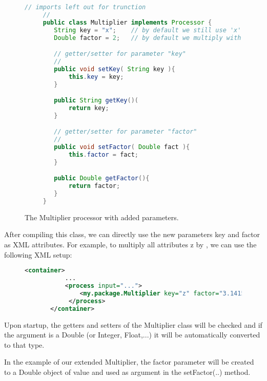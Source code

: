 \begin{figure}[h!]
  \centering \footnotesize{
  \begin{lstlisting}[language=Java]
     // imports left out for trunction
     //
     public class Multiplier implements Processor {
        String key = "x";    // by default we still use 'x'
        Double factor = 2;   // by default we multiply with 2

        // getter/setter for parameter "key"
        //
        public void setKey( String key ){
            this.key = key;
        }

        public String getKey()(
            return key;
        }

        // getter/setter for parameter "factor"
        // 
        public void setFactor( Double fact ){
            this.factor = fact;
        }

        public Double getFactor(){
            return factor;
        }
     }
  \end{lstlisting}}
  \caption{\label{fig:multiplyParameters}The {\ttfamily Multiplier} processor with added parameters.}
\end{figure}
        
After compiling this class, we can directly use the new parameters
{\ttfamily key} and {\ttfamily factor} as XML attributes. For example,
to multiply all attributes {\ttfamily z} by {}, we can
use the following XML setup:

\begin{figure}[h!]
  \centering
  \begin{lstlisting}[language=XML]
       <container>
           ...
           <process input="...">
               <my.package.Multiplier key="z" factor="3.1415" />
            </process>
       </container>
  \end{lstlisting}
  \caption{\label{fig:multiplyParametersXML}}
\end{figure}

Upon startup, the getters and setters of the Multiplier class will be
checked and if the argument is a Double (or Integer, Float,...) it
will be automatically converted to that type.

In the example of our extended Multiplier, the {\ttfamily factor}
parameter will be created to a Double object of value {} and
used as argument in the {\ttfamily setFactor(..)} method.
